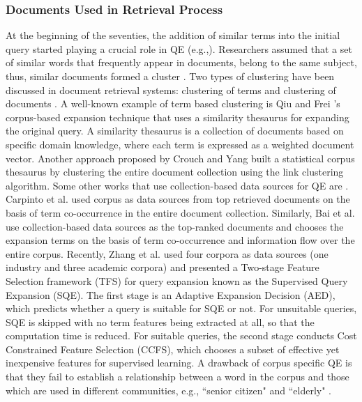\subsubsection{Documents Used in Retrieval Process} \label{sec1}
At the beginning of the seventies, the addition of similar terms into the initial query started playing a crucial role in QE (e.g.,\cite{jardine1971use,minker1972evaluation,willett1988recent}). Researchers assumed that a set of similar words that frequently appear in documents, belong  to the same subject, thus, similar documents formed a cluster \cite{peat1991limitations}. Two types of clustering have been discussed in document retrieval systems: clustering of terms and clustering of documents \cite{willett1988recent}. A well-known example of term based clustering is Qiu and Frei \cite{qiu1993concept}'s corpus-based expansion technique that uses a similarity thesaurus for expanding the original query. A similarity thesaurus is a collection of documents based on specific domain knowledge, where each term is expressed as a weighted document vector. Another approach proposed by Crouch and Yang \cite{crouch1992experiments} built a statistical corpus thesaurus by clustering the entire document collection using the link clustering algorithm. Some other works that use collection-based data sources for QE are  \cite{jones1971automatic,attar1977local,xu1996query,gauch1999corpus,carpineto2001information,bai2005query}. Carpinto et al. \cite{carpineto2001information} used corpus as data sources from top retrieved documents on the basis of term co-occurrence in the entire document collection. Similarly, Bai et al. \cite{bai2005query} use collection-based data sources as the top-ranked documents and chooses the expansion terms on the basis of term co-occurrence and information flow over the entire corpus. Recently, Zhang et al. \cite{zhang2016learning} used four corpora as data sources (one industry and three academic corpora) and presented a Two-stage Feature Selection framework (TFS) for query expansion known as the Supervised Query Expansion (SQE). The first stage is an Adaptive Expansion Decision (AED), which predicts whether a query is suitable for SQE or not. For unsuitable queries, SQE is skipped with no term features being extracted at all, so that the computation time is reduced. For suitable queries, the second stage conducts Cost Constrained Feature Selection (CCFS), which chooses a subset of effective yet inexpensive features for supervised learning. A drawback of corpus specific QE is that they fail to establish a relationship between a word in the corpus and those which are used in different communities, e.g.,  ``senior citizen" and ``elderly" \cite{gauch1999corpus}.

